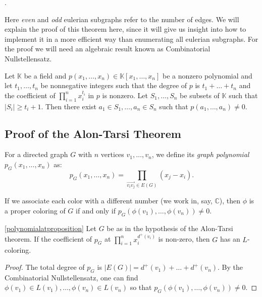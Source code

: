 .

Here \emph{even} and \emph{odd} eulerian subgraphs refer to the number of edges. We will explain the proof of this theorem here,
since it will give us insight into how to implement it in a more efficient way than enumerating all eulerian subgraphs. For the
proof we will need an algebraic result known as Combinatorial Nullstellensatz.

\begin{theorem}
Let $\mathbb{K}$ be a field and $p(x_1, \ldots, x_n) \in \mathbb{K}[x_1, \ldots, x_n]$ be a nonzero polynomial and let $t_1, \ldots, t_n$ be nonnegative integers such that the
 degree of $p$ is $t_1 + \ldots + t_n$ and the coefficient of $\prod_{i=1}^n x_i^{t_i}$ in $p$ is nonzero. 
 Let $S_1, \ldots, S_n$ be subsets of $\mathbb{K}$ such that $|S_i| \geq t_i+1$. Then there exist $a_1 \in S_1, \ldots, a_n \in S_n$ such that
$p(a_1, \ldots, a_n) \neq 0$.
\end{theorem}

\subsection{Proof of the Alon-Tarsi Theorem}

\begin{definition}
For a directed graph $G$ with $n$ vertices $v_1, \ldots, v_n$, we define its \emph{graph polynomial} $p_G(x_1, \ldots, x_n)$ as:
\begin{equation}
\label{eq:graphpolynomialproduct}
p_G(x_1, \ldots, x_n) = \prod_{\overrightarrow{v_iv_j}\in E(G)} (x_j-x_i).
\end{equation}
\end{definition}


\begin{observation}
If we associate each color with a different number (we work in, say, $\mathbb{C}$), then $\phi$ is a proper coloring of 
$G$ if and only if $p_G(\phi(v_1), \ldots, \phi(v_n)) \neq 0$. 
\end{observation}

\begin{proposition}
\ref{polynomialatproposition}
Let $G$ be as in the hypothesis of the Alon-Tarsi theorem.
If the coefficient of $p_G$ at $\prod_{i=1}^n x_i^{d^+(v_i)}$ is non-zero, then $G$ has an $L$-coloring.
\end{proposition}
\begin{proof}
The total degree of $p_G$ is $|E(G)| = d^+(v_1) + \ldots + d^+(v_n)$. By the Combinatorial Nullstellensatz, 
one can find $\phi(v_1) \in L(v_1), \ldots, \phi(v_n) \in L(v_n)$ so that $p_G(\phi(v_1), \ldots, \phi(v_n)) \neq 0$.
\end{proof}

